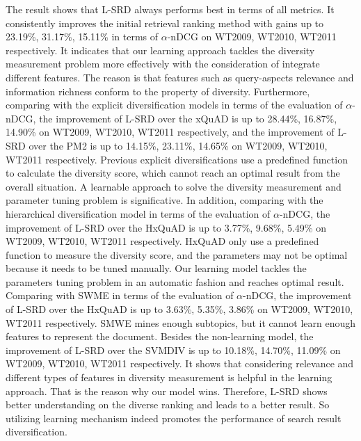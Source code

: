 \documentclass[review]{elsarticle}
\newcommand\revised[1]{{\color{black} #1}}
\begin{document}
The result shows that L-SRD always performs best in terms of all metrics. It consistently improves the initial retrieval ranking method with gains up to \revised{23.19\%, 31.17\%, 15.11\%} in terms of $\alpha$-nDCG on WT2009, WT2010, WT2011 respectively. It indicates that our learning approach tackles the diversity measurement problem more effectively with the consideration of integrate different features. The reason is that features such as query-aspects relevance and information richness conform to the property of diversity. Furthermore, comparing with the explicit diversification models in terms of the evaluation of $\alpha$-nDCG, the improvement of L-SRD over the xQuAD is up to \revised{28.44\%, 16.87\%, 14.90\%} on WT2009, WT2010, WT2011 respectively, and the improvement of L-SRD over the PM2 is up to \revised{14.15\%, 23.11\%, 14.65\%} on WT2009, WT2010, WT2011 respectively. Previous explicit diversifications use a predefined function to calculate the diversity score, which cannot reach an optimal result from the overall situation. A learnable approach to solve the diversity measurement and parameter tuning problem is significative. 
\revised{
	In addition, comparing with the hierarchical diversification model in terms of the evaluation of $\alpha$-nDCG, the improvement of L-SRD over the HxQuAD is up to \revised{3.77\%, 9.68\%, 5.49\%} on WT2009, WT2010, WT2011 respectively. HxQuAD only use a predefined function to measure the diversity score, and the parameters may not be optimal because it needs to be tuned manually. Our learning model tackles the parameters tuning problem in an automatic fashion and reaches optimal result.
	Comparing with SWME in terms of the evaluation of $\alpha$-nDCG, the improvement of L-SRD over the HxQuAD is up to \revised{3.63\%, 5.35\%, 3.86\%} on WT2009, WT2010, WT2011 respectively. SMWE mines enough subtopics, but it cannot learn enough features to represent the document.
	}Besides the non-learning model, the improvement of L-SRD over the SVMDIV is up to 10.18\%, 14.70\%, 11.09\% on WT2009, WT2010, WT2011 respectively. It shows that considering relevance and different types of features in diversity measurement is helpful in the learning approach. That is the reason why our model wins. %
Therefore, L-SRD shows better understanding on the diverse ranking and leads to a better result. So utilizing learning mechanism indeed promotes the performance of search result diversification.
\end{document}
